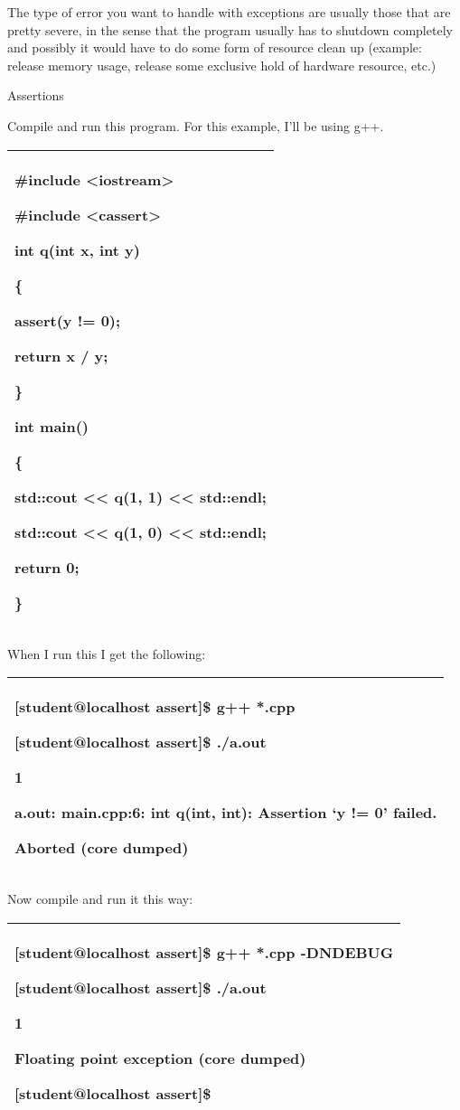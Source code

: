 \documentclass[
]{article}
\begin{document}
The type of error you want to handle with exceptions are usually those
that are pretty severe, in the sense that the program usually has to
shutdown completely and possibly it would have to do some form of
resource clean up (example: release memory usage, release some exclusive
hold of hardware resource, etc.)

Assertions

Compile and run this program. For this example, I'll be using g++.

\begin{longtable}[]{@{}l@{}}
\toprule
\endhead
\begin{minipage}[t]{0.97\columnwidth}\raggedright
\#include \textless iostream\textgreater{}

\#include \textless cassert\textgreater{}

int q(int x, int y)

\{

assert(y != 0);

return x / y;

\}

int main()

\{

std::cout \textless\textless{} q(1, 1) \textless\textless{} std::endl;

std::cout \textless\textless{} q(1, 0) \textless\textless{} std::endl;

return 0;

\}\strut
\end{minipage}\tabularnewline
\bottomrule
\end{longtable}

When I run this I get the following:

\begin{longtable}[]{@{}l@{}}
\toprule
\endhead
\begin{minipage}[t]{0.97\columnwidth}\raggedright
{[}student@localhost assert{]}\$ g++ *.cpp

{[}student@localhost assert{]}\$ ./a.out

1

a.out: main.cpp:6: int q(int, int): Assertion `y != 0' failed.

Aborted (core dumped)\strut
\end{minipage}\tabularnewline
\bottomrule
\end{longtable}

Now compile and run it this way:

\begin{longtable}[]{@{}l@{}}
\toprule
\endhead
\begin{minipage}[t]{0.97\columnwidth}\raggedright
{[}student@localhost assert{]}\$ g++ *.cpp \textbf{-DNDEBUG}

{[}student@localhost assert{]}\$ ./a.out

1

Floating point exception (core dumped)

{[}student@localhost assert{]}\$ \strut
\end{minipage}\tabularnewline
\bottomrule
\end{longtable}
\end{document}
